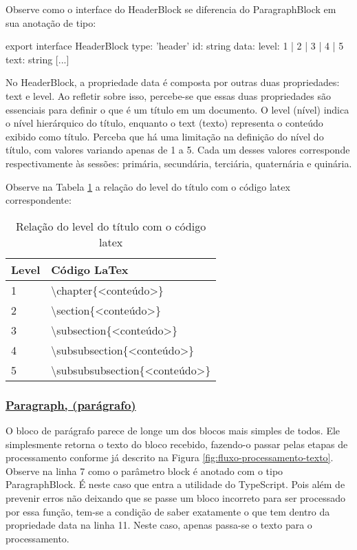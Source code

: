 Observe como o interface do HeaderBlock se diferencia
do ParagraphBlock em sua anotação de tipo:

\begin{HeaderBlockCode}
[...]
export interface HeaderBlock {
    type: 'header'
    id: string
    data: {
        level: 1 | 2 | 3 | 4 | 5
        text: string
    }
}
[...]
\end{HeaderBlockCode}

No HeaderBlock, a propriedade data é composta por outras duas propriedades: text e level.
Ao refletir sobre isso, percebe-se que essas duas propriedades são essenciais para definir
o que é um título em um documento. O level (nível) indica o nível hierárquico do título,
enquanto o text (texto) representa o conteúdo exibido como título. Perceba que há uma
limitação na definição do nível do título, com valores variando apenas de 1 a 5.
Cada um desses valores corresponde respectivamente às sessões: primária, secundária, terciária, quaternária e quinária.

Observe na
            Tabela \ref{tbl:header-level-latex}
            a relação do level do título com o código
            \acrshort{latex}
            correspondente:

\begin{table}[H]
    \centering
    \caption{Relação do level do título com o código latex}
    \label{tbl:header-level-latex}
    \renewcommand{\arraystretch}{1.5}
    \begin{tabular}{p{1.0320cm} p{5.8480cm}}
        \hline
        \textbf{Level} & \textbf{Código LaTex} \\
        \hline
        1 & \textbackslash chapter\{<conteúdo>\} \\
		2 & \textbackslash section\{<conteúdo>\} \\
		3 & \textbackslash subsection\{<conteúdo>\} \\
		4 & \textbackslash subsubsection\{<conteúdo>\} \\
		5 & \textbackslash subsubsubsection\{<conteúdo>\} \\
        \hline
        
    \end{tabular}
\end{table}

\subsubsection{\underline{Paragraph, (parágrafo)}}

O bloco de parágrafo parece de longe um dos blocos mais simples de todos.
Ele simplesmente retorna o texto do bloco recebido, fazendo-o passar
pelas etapas de processamento conforme já descrito na
Figura \ref{fig:fluxo-processamento-texto}.
Observe na linha 7 como o parâmetro block é anotado com o tipo ParagraphBlock.
É neste caso que entra a utilidade do TypeScript. Pois além de prevenir erros
não deixando que se passe um bloco incorreto para ser processado por essa função,
tem-se a condição de saber exatamente o que tem dentro da propriedade
data na linha 11. Neste caso, apenas passa-se o texto para o processamento.

